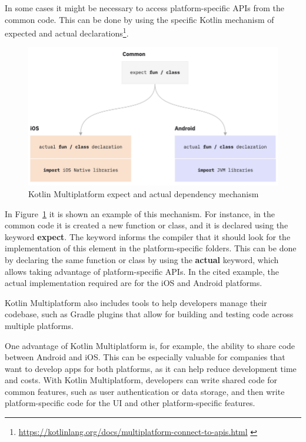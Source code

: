 In some cases it might be necessary to access platform-specific APIs from the common code. This can be done by using the specific Kotlin mechanism of expected and actual declarations\footnote{\url{https://kotlinlang.org/docs/multiplatform-connect-to-apis.html} \label{expect_actual_footnote}}.\newline
\begin{figure}[!ht]
    \centering
    \includegraphics[scale=0.85]{document/chapters/4-collektive/images/km_expect_actual.png}
    \caption{Kotlin Multiplatform expect and actual dependency mechanism}
    \label{fig:km_expect_actual}
\end{figure}
In Figure~\ref{fig:km_expect_actual} it is shown an example of this mechanism. For instance, in the common code it is created a new function or class, and it is declared using the keyword \textbf{expect}. The keyword informs the compiler that it should look for the implementation of this element in the platform-specific folders. This can be done by declaring the same function or class by using the \textbf{actual} keyword, which allows taking advantage of platform-specific APIs. In the cited example, the actual implementation required are for the iOS and Android platforms.

Kotlin Multiplatform also includes tools to help developers manage their codebase, such as Gradle plugins that allow for building and testing code across multiple platforms.

One advantage of Kotlin Multiplatform is, for example, the ability to share code between Android and iOS. This can be especially valuable for companies that want to develop apps for both platforms, as it can help reduce development time and costs. With Kotlin Multiplatform, developers can write shared code for common features, such as user authentication or data storage, and then write platform-specific code for the UI and other platform-specific features.

